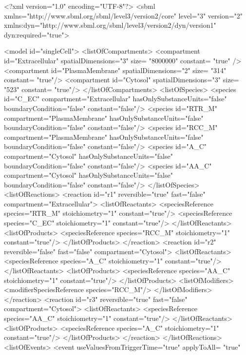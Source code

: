 \begin{example}
<?xml version="1.0" encoding="UTF-8"?>
<sbml xmlns="http://www.sbml.org/sbml/level3/version2/core" level="3" version="2"
	  xmlns:dyn="http://www.sbml.org/sbml/level3/version2/dyn/version1" dyn:required="true">

	<model id="singleCell">
		<listOfCompartments>
			<compartment id="Extracellular" spatialDimensions="3" size= "8000000" constant= "true" />
			<compartment id="PlasmaMembrane" spatialDimensions="2" size= "314" constant= "true"/>
			<compartment id="Cytosol" spatialDimensions="3" size= "523" constant= "true"/>
		</listOfCompartments>
		<listOfSpecies>
			<species id="C_EC"  compartment="Extracellular" hasOnlySubstanceUnits="false" 
							  boundaryCondition="false" constant="false"/>
			<species id="RTR_M" compartment="PlasmaMembrane" hasOnlySubstanceUnits="false" 
								boundaryCondition="false" constant="false"/>
			<species id="RCC_M" compartment="PlasmaMembrane" hasOnlySubstanceUnits="false" 
								boundaryCondition="false" constant="false"/>
			<species id="A_C"   compartment="Cytosol" hasOnlySubstanceUnits="false" 
								boundaryCondition="false" constant="false"/>
			<species id="AA_C"  compartment="Cytosol" hasOnlySubstanceUnits="false" 
								boundaryCondition="false" constant="false"/>
		</listOfSpecies>
		<listOfReactions>
			<reaction id="r1" reversible="true" fast="false" compartment="Extracellular">
				<listOfReactants>
					<speciesReference species="RTR_M" stoichiometry="1" constant="true"/>
					<speciesReference species="C_EC" stoichiometry="1" constant="true"/>
				</listOfReactants>
				<listOfProducts>
					<speciesReference species="RCC_M" stoichiometry="1" constant="true"/>
				</listOfProducts>
			</reaction>
			<reaction id="r2" reversible="false" fast="false" compartment="Cytosol">
				<listOfReactants>
					<speciesReference species="A_C" stoichiometry="1" constant="true"/>
				</listOfReactants>
				<listOfProducts>
					<speciesReference species="AA_C" stoichiometry="1" constant="true"/>
				</listOfProducts>
				<listOfModifiers>
					<modifierSpeciesReference species="RCC_M"/>
				</listOfModifiers>
			</reaction>
			<reaction id="r3" reversible="true" fast="false" compartment="Cytosol">
				<listOfReactants>
					<speciesReference species="AA_C" stoichiometry="1" constant="true"/>
				</listOfReactants>
				<listOfProducts>
					<speciesReference species="A_C" stoichiometry="1" constant="true"/>
				</listOfProducts>
			</reaction>	  
		</listOfReactions>
		<listOfEvents>
			<event useValuesFromTriggerTime="true" applyToAll= "true"

\end{example}
